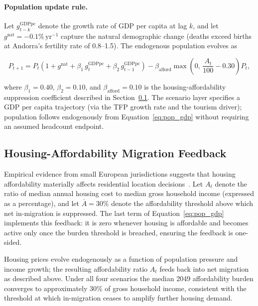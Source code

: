 \documentclass[urbansci,article,submit,pdftex,moreauthors]{Definitions/mdpi}
\begin{document}
\paragraph{Population update rule.}
Let $g^\text{GDPpc}_{t-k}$ denote the growth rate of GDP per capita at lag
$k$, and let $g^\text{nat}=-0.1\%\,\text{yr}^{-1}$ capture the natural
demographic change (deaths exceed births at Andorra's fertility rate of
0.8--1.5). The endogenous population evolves as

\begin{linenomath}
\begin{equation}
  P_{t+1} = P_t\!\left(1 + g^\text{nat}
              + \beta_1\, g^\text{GDPpc}_{t}
              + \beta_2\, g^\text{GDPpc}_{t-1}\right)
            - \beta_\text{afford}
              \max\!\left(0,\,\frac{A_t}{100} - 0.30\right)P_t,
  \label{eq:pop_gdp}
\end{equation}
\end{linenomath}

where $\beta_1=0.40$, $\beta_2=0.10$, and $\beta_\text{afford}=0.10$ is the
housing-affordability suppression coefficient described in
Section~\ref{sec:housing_feedback}. The scenario layer specifies a GDP per
capita trajectory (via the TFP growth rate and the tourism driver); population
follows endogenously from Equation~\eqref{eq:pop_gdp} without requiring an
assumed headcount endpoint.

\subsection{Housing-Affordability Migration Feedback}
\label{sec:housing_feedback}

Empirical evidence from small European jurisdictions suggests that housing
affordability materially affects residential location
decisions~\cite{Sa2015,Diamond2016}. Let $A_t$ denote the ratio of median
annual housing cost to median gross household income (expressed as a
percentage), and let $\bar{A}=30\%$ denote the affordability threshold above
which net in-migration is suppressed. The last term of
Equation~\eqref{eq:pop_gdp} implements this feedback: it is zero whenever
housing is affordable and becomes active only once the burden threshold is
breached, ensuring the feedback is one-sided.

Housing prices evolve endogenously as a function of population pressure and
income growth; the resulting affordability ratio $A_t$ feeds back into net
migration as described above. Under all four scenarios the median 2049
affordability burden converges to approximately 30\% of gross household income,
consistent with the threshold at which in-migration ceases to amplify further
housing demand.
\end{document}
